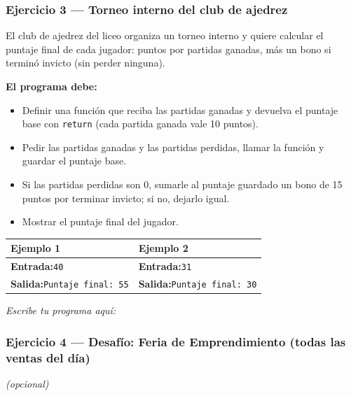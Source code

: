 \documentclass[11pt]{article}
\begin{document}
\subsubsection*{Ejercicio 3 --- Torneo interno del club de ajedrez}
El club de ajedrez del liceo organiza un torneo interno y quiere calcular el puntaje final de cada jugador: puntos por partidas ganadas, más un bono si terminó invicto (sin perder ninguna).

\textbf{El programa debe:}
\begin{itemize}
  \item Definir una función que reciba las partidas ganadas y devuelva el puntaje base con \texttt{return} (cada partida ganada vale 10 puntos).
  \item Pedir las partidas ganadas y las partidas perdidas, llamar la función y guardar el puntaje base.
  \item Si las partidas perdidas son 0, sumarle al puntaje guardado un bono de 15 puntos por terminar invicto; si no, dejarlo igual.
  \item Mostrar el puntaje final del jugador.
\end{itemize}
\vspace{1mm}
\noindent\begin{tabularx}{\linewidth}{|X|X|}
\hline
\textbf{Ejemplo 1} & \textbf{Ejemplo 2} \\
\hline
\textbf{Entrada:}\newline \texttt{4}\newline \texttt{0} & \textbf{Entrada:}\newline \texttt{3}\newline \texttt{1} \\
\hline
\textbf{Salida:}\newline \texttt{Puntaje final: 55} & \textbf{Salida:}\newline \texttt{Puntaje final: 30} \\
\hline
\end{tabularx}
\vspace{1mm}
\vspace{2mm}\textit{Escribe tu programa aquí:}\vspace{1mm}

\begin{cajaescribe}[height=5.5cm]
\end{cajaescribe}

\subsubsection*{Ejercicio 4 --- Desafío: Feria de Emprendimiento (todas las ventas del día)}
\textit{(opcional)}
\end{document}

